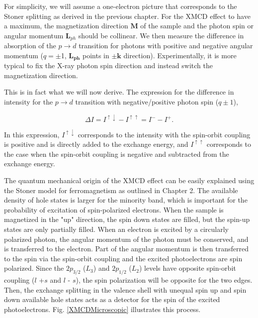 For simplicity, we will assume a one-electron picture that corresponds to the Stoner splitting as derived in the previous chapter. For the XMCD effect to have a maximum, the magnetization direction $\pmb{M}$ of the sample and the photon spin or angular momentum $\pmb{L}_{ph}$ should be collinear. We then measure the difference in absorption of the $p \rightarrow d$ transition for photons with positive and negative angular momentum ($q = \pm$1, $\pmb{L_{ph}}$ points in $\pm\pmb{k}$ direction). Experimentally, it is more typical to fix the X-ray photon spin direction and instead switch the magnetization direction.

This is in fact what we will now derive. The expression for the difference in intensity for the $p\rightarrow d$ transition with negative/positive photon spin ($q\pm 1$),

\begin{equation}
\Delta I = I^{\uparrow \downarrow} - I^{\uparrow \uparrow} = I^- - I^+.
\end{equation}

In this expression, $I^{\uparrow \downarrow}$ corresponds to the intensity with the spin-orbit coupling is positive and is directly added to the exchange energy, and $I^{\uparrow \uparrow}$ corresponds to the case when the spin-orbit coupling is negative and subtracted from the exchange energy.

The quantum mechanical origin of the XMCD effect can be easily explained using the Stoner model for ferromagnetism as outlined in Chapter 2. The available density of hole states is larger for the minority band, which is important for the probability of excitation of spin-polarized electrons. When the sample is magnetized in the "up" direction, the spin down states are filled, but the spin-up states are only partially filled. When an electron is excited by a circularly polarized photon, the angular momentum of the photon must be conserved, and is transferred to the electron. Part of the angular momentum is then transferred to the spin via the spin-orbit coupling and the excited photoelectrons are spin polarized. Since the $2p_{3/2}$ ($L_3$) and $2p_{1/2}$ ($L_2$) levels have opposite spin-orbit coupling ($l$ +$s$ and $l$ - $s$), the spin polarization will be opposite for the two edges. Then, the exchange splitting in the valence shell with unequal spin up and spin down available hole states acts as a detector for the spin of the excited photoelectrons. Fig. \ref{XMCDMicroscopic} illustrates this process.

